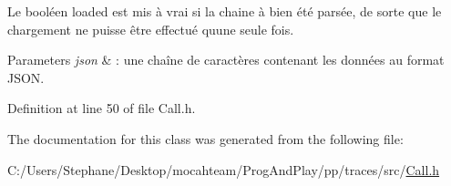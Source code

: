 Le booléen {\ttfamily loaded} est mis à vrai si la chaine à bien été parsée, de sorte que le chargement ne puisse être effectué qu\textquotesingle{}une seule fois.


\begin{DoxyParams}{Parameters}
{\em json} & \+: une chaîne de caractères contenant les données au format J\+S\+ON. \\
\hline
\end{DoxyParams}


Definition at line 50 of file Call.\+h.



The documentation for this class was generated from the following file\+:\begin{DoxyCompactItemize}
\item 
C\+:/\+Users/\+Stephane/\+Desktop/mocahteam/\+Prog\+And\+Play/pp/traces/src/\hyperlink{_call_8h}{Call.\+h}\end{DoxyCompactItemize}
